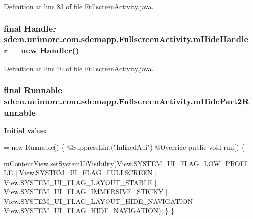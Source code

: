 Definition at line 83 of file Fullscreen\+Activity.\+java.

\hypertarget{classsdem_1_1unimore_1_1com_1_1sdemapp_1_1_fullscreen_activity_ad4475520f7d10bee6847afe83221d311}{
\subsubsection[{m\+Hide\+Handler}]{\setlength{\rightskip}{0pt plus 5cm}final Handler sdem.\+unimore.\+com.\+sdemapp.\+Fullscreen\+Activity.\+m\+Hide\+Handler = new Handler()\hspace{0.3cm}{\ttfamily [private]}}}\label{classsdem_1_1unimore_1_1com_1_1sdemapp_1_1_fullscreen_activity_ad4475520f7d10bee6847afe83221d311}


Definition at line 40 of file Fullscreen\+Activity.\+java.

\hypertarget{classsdem_1_1unimore_1_1com_1_1sdemapp_1_1_fullscreen_activity_a2b840b0dda8f24f21123d96b06a6576d}{
\subsubsection[{m\+Hide\+Part2\+Runnable}]{\setlength{\rightskip}{0pt plus 5cm}final Runnable sdem.\+unimore.\+com.\+sdemapp.\+Fullscreen\+Activity.\+m\+Hide\+Part2\+Runnable\hspace{0.3cm}{\ttfamily [private]}}}\label{classsdem_1_1unimore_1_1com_1_1sdemapp_1_1_fullscreen_activity_a2b840b0dda8f24f21123d96b06a6576d}
{\bfseries Initial value\+:}
\begin{DoxyCode}
= \textcolor{keyword}{new} Runnable() \{
        @SuppressLint(\textcolor{stringliteral}{"InlinedApi"})
        @Override
        \textcolor{keyword}{public} \textcolor{keywordtype}{void} run() \{
            

            
            
            
            \hyperlink{classsdem_1_1unimore_1_1com_1_1sdemapp_1_1_fullscreen_activity_a16c3f7ad16b7cb1e5edd2fb951bca41f}{mContentView}.setSystemUiVisibility(View.SYSTEM\_UI\_FLAG\_LOW\_PROFILE
                    | View.SYSTEM\_UI\_FLAG\_FULLSCREEN
                    | View.SYSTEM\_UI\_FLAG\_LAYOUT\_STABLE
                    | View.SYSTEM\_UI\_FLAG\_IMMERSIVE\_STICKY
                    | View.SYSTEM\_UI\_FLAG\_LAYOUT\_HIDE\_NAVIGATION
                    | View.SYSTEM\_UI\_FLAG\_HIDE\_NAVIGATION);
        \}
    \}
\end{DoxyCode}


